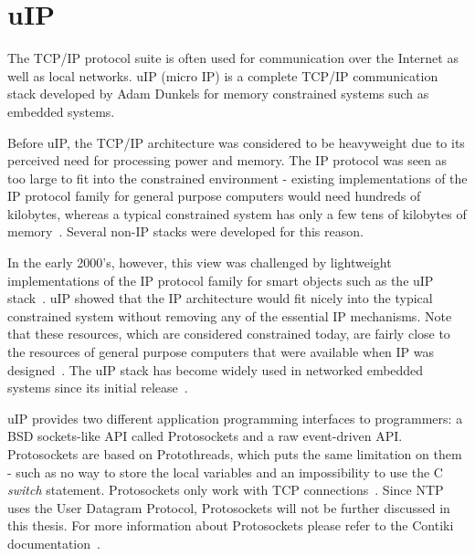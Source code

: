 
\section{uIP}\label{sec:contiki-uip}
The TCP/IP protocol suite is often used for communication over the Internet as well as local networks.
uIP (micro IP) is a complete TCP/IP communication stack developed by Adam Dunkels
for memory constrained systems such as embedded systems.

Before uIP, the TCP/IP architecture was considered to be heavyweight
due to its perceived need for processing power and memory.
The IP protocol was seen as too large to fit into the constrained environment -
existing implementations of the IP protocol family for general purpose computers would need hundreds
of kilobytes, whereas a typical constrained system has only a few tens of kilobytes of memory~\cite{interconnecting}. %
Several non-IP stacks were developed for this reason.

In the early 2000's, however, this view was challenged by lightweight implementations of the IP
protocol family for smart objects such as the uIP stack~\cite{interconnecting}.
uIP showed that the IP architecture would fit nicely into the typical constrained system
without removing any of the essential IP mechanisms.
Note that these resources, which are considered constrained today, are fairly close to the
resources of general purpose computers that were available when IP was designed~\cite{interconnecting}.
The uIP stack has become widely used in networked embedded systems
since its initial release~\cite{interconnecting, thesis-programming}.

uIP provides two different application programming interfaces to programmers:
a BSD sockets-like API called Protosockets and a raw event-driven API.
Protosockets are based on Protothreads, which puts the same limitation on them - such as %
no way to store the local variables and an impossibility to use the C {\it switch} statement.
Protosockets only work with TCP connections~\cite{contiki-docs}.
Since NTP uses the User Datagram Protocol, Protosockets will not be further
discussed in this thesis. For more information about Protosockets
please refer to the Contiki documentation~\cite{contiki-docs}.

